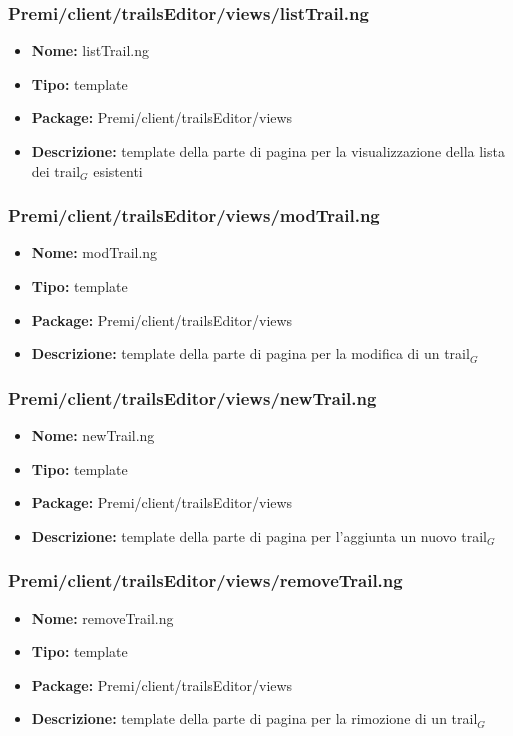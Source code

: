 \subsubsection{Premi/client/trailsEditor/views/listTrail.ng}
\begin{itemize}
  \item[] \textbf{Nome:} listTrail.ng
  \item[] \textbf{Tipo:} template
  \item[] \textbf{Package:} Premi/client/trailsEditor/views
  \item[] \textbf{Descrizione:}  template della parte di pagina per la visualizzazione della lista dei trail$_G$ esistenti
\end{itemize}
\subsubsection{Premi/client/trailsEditor/views/modTrail.ng}
\begin{itemize}
  \item[] \textbf{Nome:} modTrail.ng
  \item[] \textbf{Tipo:} template
  \item[] \textbf{Package:} Premi/client/trailsEditor/views
  \item[] \textbf{Descrizione:}  template della parte di pagina per la modifica di un trail$_G$
\end{itemize}
\subsubsection{Premi/client/trailsEditor/views/newTrail.ng}
\begin{itemize}
  \item[] \textbf{Nome:} newTrail.ng
  \item[] \textbf{Tipo:} template
  \item[] \textbf{Package:} Premi/client/trailsEditor/views
  \item[] \textbf{Descrizione:}  template della parte di pagina per l'aggiunta un nuovo trail$_G$
\end{itemize}
\subsubsection{Premi/client/trailsEditor/views/removeTrail.ng}
\begin{itemize}
  \item[] \textbf{Nome:} removeTrail.ng
  \item[] \textbf{Tipo:} template
  \item[] \textbf{Package:} Premi/client/trailsEditor/views
  \item[] \textbf{Descrizione:}  template della parte di pagina per la rimozione di un trail$_G$
\end{itemize}
